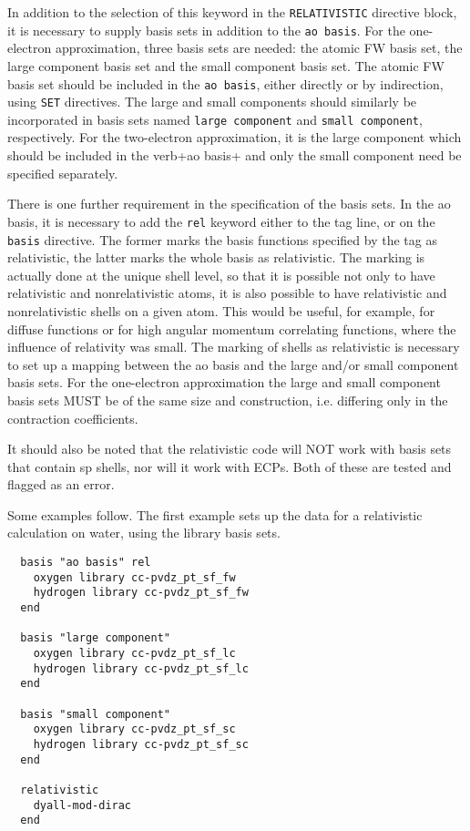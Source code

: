 In addition to the selection of this keyword in the \verb+RELATIVISTIC+
directive block, it is necessary to supply basis sets in addition to the
\verb+ao basis+. For the one-electron approximation, three basis sets are
needed: the atomic FW basis set, the large component basis set and the small
component basis set. The atomic FW basis set should be included in the
\verb+ao basis+, either directly or by indirection, using \verb+SET+
directives.  The large and small components should similarly be incorporated
in basis sets named \verb+large component+ and \verb+small component+,
respectively. For the two-electron approximation, it is the large component
which should be included in the verb+ao basis+ and only the small component
need be specified separately.

There is one further requirement in the specification of the basis sets. In
the ao basis, it is necessary to add the \verb+rel+ keyword either to the
tag line, or on the \verb+basis+ directive. The former marks the basis
functions specified by the tag as relativistic, the latter marks the whole
basis as relativistic. The marking is actually done at the unique shell
level, so that it is possible not only to have relativistic and
nonrelativistic atoms, it is also possible to have relativistic and
nonrelativistic shells on a given atom. This would be useful, for example,
for diffuse functions or for high angular momentum correlating functions,
where the influence of relativity was small. The marking of shells as
relativistic is necessary to set up a mapping between the ao basis and the
large and/or small component basis sets. For the one-electron approximation
the large and small component basis sets MUST be of the same size and
construction, i.e. differing only in the contraction coefficients.

It should also be noted that the relativistic code will NOT work with basis
sets that contain sp shells, nor will it work with ECPs. Both of these are
tested and flagged as an error.

Some examples follow. The first example sets up the data for a relativistic
calculation on water, using the library basis sets.

\begin{verbatim}
  basis "ao basis" rel
    oxygen library cc-pvdz_pt_sf_fw
    hydrogen library cc-pvdz_pt_sf_fw
  end

  basis "large component"
    oxygen library cc-pvdz_pt_sf_lc
    hydrogen library cc-pvdz_pt_sf_lc
  end

  basis "small component"
    oxygen library cc-pvdz_pt_sf_sc
    hydrogen library cc-pvdz_pt_sf_sc
  end

  relativistic
    dyall-mod-dirac
  end
\end{verbatim}

